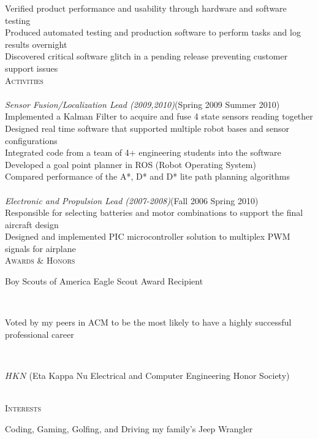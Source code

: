 \documentclass[11pt,letterpaper]{article}
\newcommand{\SectionHeader}[1]{\textsc{#1} \vspace{-2px}\\}
\newcommand{\CompanyHeader}[4]{\hspace*{.52in}{\bf#1} \hfill #2 \\\hspace*{.5in}\emph{#3}\hfill (#4) \\}
\newcommand{\ResumeItem}[1]{\hspace*{.5in}\textopenbullet\hspace*{.2in}#1\\}
\newcommand{\TextBlock}[1]
{\hspace*{.5in} \begin{minipage}[t]{\textwidth -.5in} #1 \end{minipage}\\}
\begin{document}
 \ResumeItem{Verified product performance and usability through hardware and software testing}
 \ResumeItem{Produced automated testing and production software to perform tasks and log results overnight} 
 \ResumeItem{Discovered critical software glitch in a pending release preventing customer support issues}
\SectionHeader{Activities}
\CompanyHeader{Intelligent Ground Vehicle Competition (IGVC)}{}{Sensor Fusion/Localization Lead (2009,2010)}{Spring 2009 \textendash { }Summer 2010}
 \ResumeItem{Implemented a Kalman Filter to acquire and fuse 4 state sensors reading together}
 \ResumeItem{Designed real time software that supported multiple  robot bases and sensor configurations}
 \ResumeItem{Integrated code from a team of 4+ engineering students into the software}
 \ResumeItem{Developed a goal point planner in ROS (Robot Operating System)}
 \ResumeItem{Compared performance of the A*, D* and D* lite path planning algorithms}
 \CompanyHeader{Design Build Fly/DBF}{}{Electronic and Propulsion Lead (2007-2008)}{Fall 2006 \textendash { }Spring 2010}
 \ResumeItem{Responsible for selecting batteries and motor combinations to support the final aircraft design}
\ResumeItem{Designed and implemented PIC microcontroller solution to multiplex PWM signals for airplane}
\SectionHeader{Awards \& Honors}
\TextBlock{Boy Scouts of America Eagle Scout Award Recipient}
\TextBlock{Voted by my peers in ACM to be the most likely to have a highly successful professional career}
\TextBlock{$HKN$ (Eta Kappa Nu Electrical and Computer Engineering Honor Society)}
\SectionHeader{Interests}
\TextBlock{Coding, Gaming, Golfing, and Driving my family's Jeep Wrangler}
\end{document}
